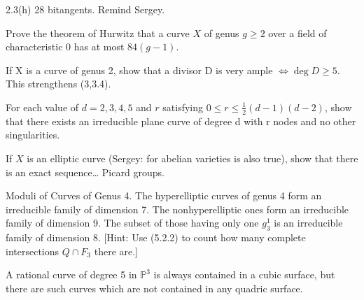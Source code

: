 \begin{manualexercise}{2.3(h)}
	28 bitangents. Remind Sergey.
\end{manualexercise}

\begin{manualexercise}{2.5}
	Prove the theorem of Hurwitz that a curve $X$ of genus $g\geq 2$ over a field of characteristic 0 has at most $84(g-1)$.
\end{manualexercise}

\begin{manualexercise}{3.1}
	If X is a curve of genus 2, show that a divisor D is very ample $\iff \operatorname{deg} D \geq 5$.  This strengthens (3,3.4).
\end{manualexercise}

\begin{manualexercise}{3.12}
	For each value of $d = 2,3,4,5$ and $r$ satisfying $0\leq r\leq \frac{1}{2}(d-1)(d-2)$, show  that there exists an irreducible plane curve of degree d with r nodes and no other  singularities.
\end{manualexercise}

\begin{manualexercise}{4.10}
	If $X$ is an elliptic curve (Sergey: for abelian varieties is also true), show that there is an exact sequence… Picard groups.
\end{manualexercise}

\begin{manualexercise}{5.3}
	Moduli of Curves of Genus 4. The hyperelliptic curves of genus 4 form an irreducible family of dimension 7. The nonhyperelliptic ones form an irreducible  family of dimension 9. The subset of those having only one $g_3^{1}$ is an irreducible  family of dimension 8. [Hint: Use (5.2.2) to count how many complete intersections $Q\cap F_3$ there are.]  
\end{manualexercise}

\begin{manualexercise}{6.2}
	A rational curve of degree 5 in $\mathbb{P}^{3}$ is always contained in a cubic surface, but there  are such curves which are not contained in any quadric surface.  
\end{manualexercise}

